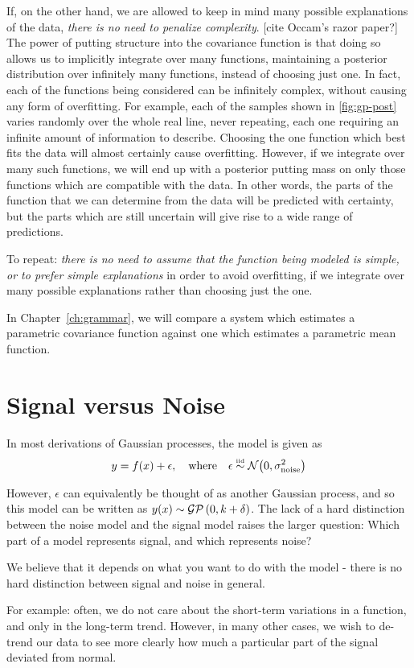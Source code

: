 If, on the other hand, we are allowed to keep in mind many possible explanations of the data, \emph{there is no need to penalize complexity}. [cite Occam's razor paper?]
The power of putting structure into the covariance function is that doing so allows us to implicitly integrate over many functions, maintaining a posterior distribution over infinitely many functions, instead of choosing just one.
In fact, each of the functions being considered can be infinitely complex, without causing any form of overfitting.
For example, each of the samples shown in \cref{fig:gp-post} varies randomly over the whole real line, never repeating, each one requiring an infinite amount of information to describe.
Choosing the one function which best fits the data will almost certainly cause overfitting.
However, if we integrate over many such functions, we will end up with a posterior putting mass on only those functions which are compatible with the data.
In other words, the parts of the function that we can determine from the data will be predicted with certainty, but the parts which are still uncertain will give rise to a wide range of predictions.

To repeat: \emph{there is no need to assume that the function being modeled is simple, or to prefer simple explanations} in order to avoid overfitting, if we integrate over many possible explanations rather than choosing just the one.

In Chapter~\ref{ch:grammar}, we will compare a system which estimates a parametric covariance function against one which estimates a parametric mean function.






\section{Signal versus Noise}

In most derivations of Gaussian processes, the model is given as
%
\begin{align}
y = f(x) + \epsilon, \quad \textnormal{where} \quad \epsilon \overset{\mbox{\tiny iid}}{\sim} \mathcal{N}\!\left(0,\sigma^2_{\textnormal{noise}}\right)
\end{align}

However, $\epsilon$ can equivalently be thought of as another Gaussian process, and so this model can be written as $y(x) \sim \mathcal{GP}\left(0, k + \delta \right)$.  The lack of a hard distinction between the noise model and the signal model raises the larger question:  Which part of a model represents signal, and which represents noise?

We believe that it depends on what you want to do with the model - there is no hard distinction between signal and noise in general.

For example: often, we do not care about the short-term variations in a function, and only in the long-term trend.
However, in many other cases, we wish to de-trend our data to see more clearly how much a particular part of the signal deviated from normal.

\fi
